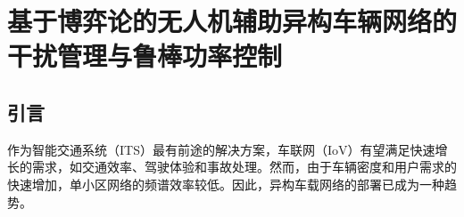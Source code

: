 \chapter{基于博弈论的无人机辅助异构车辆网络的干扰管理与鲁棒功率控制}

\section{引言}\label{section2-1}
作为智能交通系统（ITS）最有前途的解决方案，车联网（IoV）有望满足快速增长的需求，如交通效率、驾驶体验和事故处理。然而，由于车辆密度和用户需求的快速增加，单小区网络的频谱效率较低\cite{TFL}。因此，异构车载网络的部署已成为一种趋势。

